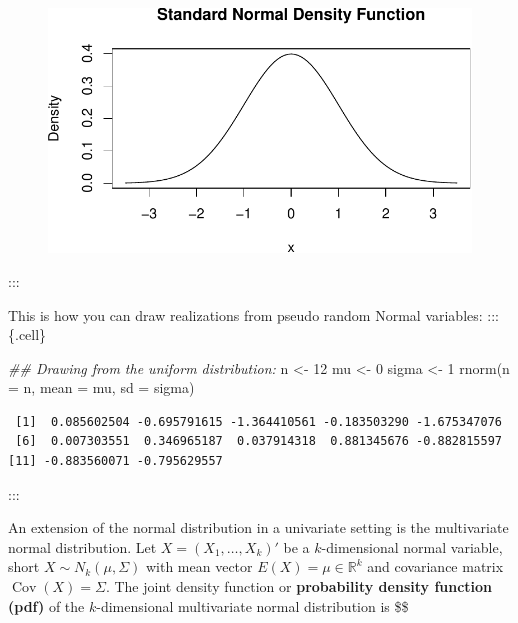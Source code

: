 \documentclass[
  letterpaper,
  DIV=11,
  numbers=noendperiod]{scrreprt}
\newenvironment{Shaded}{\begin{snugshade}}{\end{snugshade}}
\newcommand{\AttributeTok}[1]{\textcolor[rgb]{0.40,0.45,0.13}{#1}}
\newcommand{\DecValTok}[1]{\textcolor[rgb]{0.68,0.00,0.00}{#1}}
\newcommand{\DocumentationTok}[1]{\textcolor[rgb]{0.37,0.37,0.37}{\textit{#1}}}
\newcommand{\FunctionTok}[1]{\textcolor[rgb]{0.28,0.35,0.67}{#1}}
\newcommand{\NormalTok}[1]{\textcolor[rgb]{0.00,0.23,0.31}{#1}}
\newcommand{\OtherTok}[1]{\textcolor[rgb]{0.00,0.23,0.31}{#1}}
\theoremstyle{definition}
\theoremstyle{plain}
\theoremstyle{plain}
\theoremstyle{remark}
\begin{document}
\begin{figure}[H]

{\centering \includegraphics{./02-Review-Prob_n_Stats_files/figure-pdf/unnamed-chunk-10-1.pdf}

}

\end{figure}

:::

This is how you can draw realizations from pseudo random Normal
variables: ::: \{.cell\}

\begin{Shaded}
\begin{Highlighting}[]
\DocumentationTok{\#\# Drawing from the uniform distribution:}
\NormalTok{n     }\OtherTok{\textless{}{-}} \DecValTok{12}
\NormalTok{mu    }\OtherTok{\textless{}{-}} \DecValTok{0}
\NormalTok{sigma }\OtherTok{\textless{}{-}} \DecValTok{1}
\FunctionTok{rnorm}\NormalTok{(}\AttributeTok{n =}\NormalTok{ n, }\AttributeTok{mean =}\NormalTok{ mu, }\AttributeTok{sd =}\NormalTok{ sigma) }
\end{Highlighting}
\end{Shaded}

\begin{verbatim}
 [1]  0.085602504 -0.695791615 -1.364410561 -0.183503290 -1.675347076
 [6]  0.007303551  0.346965187  0.037914318  0.881345676 -0.882815597
[11] -0.883560071 -0.795629557
\end{verbatim}

:::

An extension of the normal distribution in a univariate setting is the
multivariate normal distribution. Let \(X=(X_1,\dots,X_k)'\) be a
\(k\)-dimensional normal variable, short \(X\sim N_k(\mu,\Sigma)\) with
mean vector \(E(X)=\mu\in\mathbb{R}^k\) and covariance matrix
\(\operatorname{Cov}(X)=\Sigma\). The joint density function or
\textbf{probability density function (pdf)} of the \(k\)-dimensional
multivariate normal distribution is \$\$
\end{document}
